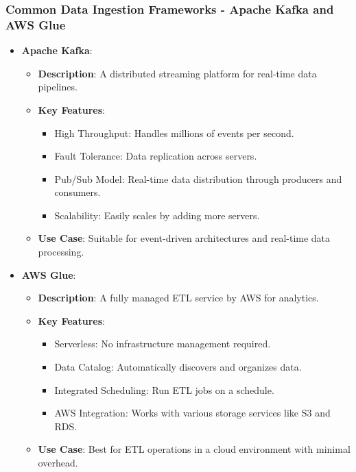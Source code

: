 \documentclass{beamer}
\begin{document}
\begin{frame}[fragile]
    \frametitle{Common Data Ingestion Frameworks - Apache Kafka and AWS Glue}
    \begin{itemize}
        \item \textbf{Apache Kafka}:
        \begin{itemize}
            \item \textbf{Description}: A distributed streaming platform for real-time data pipelines.
            \item \textbf{Key Features}:
            \begin{itemize}
                \item High Throughput: Handles millions of events per second.
                \item Fault Tolerance: Data replication across servers.
                \item Pub/Sub Model: Real-time data distribution through producers and consumers.
                \item Scalability: Easily scales by adding more servers.
            \end{itemize}
            \item \textbf{Use Case}: Suitable for event-driven architectures and real-time data processing.
        \end{itemize}
        \item \textbf{AWS Glue}:
        \begin{itemize}
            \item \textbf{Description}: A fully managed ETL service by AWS for analytics.
            \item \textbf{Key Features}:
            \begin{itemize}
                \item Serverless: No infrastructure management required.
                \item Data Catalog: Automatically discovers and organizes data.
                \item Integrated Scheduling: Run ETL jobs on a schedule.
                \item AWS Integration: Works with various storage services like S3 and RDS.
            \end{itemize}
            \item \textbf{Use Case}: Best for ETL operations in a cloud environment with minimal overhead.
        \end{itemize}
    \end{itemize}
\end{frame}
\end{document}
